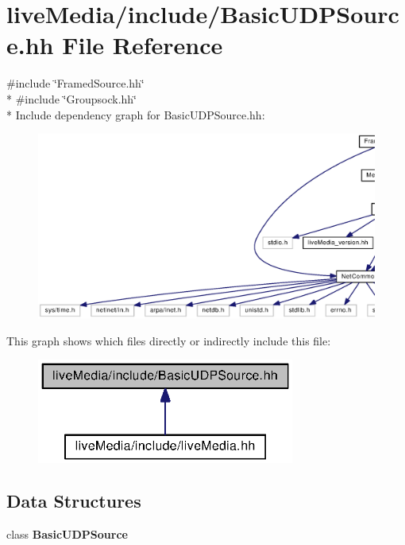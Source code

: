 \section{live\+Media/include/\+Basic\+U\+D\+P\+Source.hh File Reference}
\label{BasicUDPSource_8hh}
{\ttfamily \#include \char`\"{}Framed\+Source.\+hh\char`\"{}}\\*
{\ttfamily \#include \char`\"{}Groupsock.\+hh\char`\"{}}\\*
Include dependency graph for Basic\+U\+D\+P\+Source.\+hh\+:
\nopagebreak
\begin{figure}[H]
\begin{center}
\leavevmode
\includegraphics[width=350pt]{BasicUDPSource_8hh__incl}
\end{center}
\end{figure}
This graph shows which files directly or indirectly include this file\+:
\nopagebreak
\begin{figure}[H]
\begin{center}
\leavevmode
\includegraphics[width=240pt]{BasicUDPSource_8hh__dep__incl}
\end{center}
\end{figure}
\subsection*{Data Structures}
\begin{DoxyCompactItemize}
\item 
class {\bf Basic\+U\+D\+P\+Source}
\end{DoxyCompactItemize}
